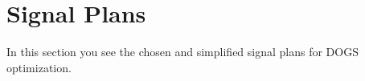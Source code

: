 \section{Signal Plans}
\label{app:signalplans}
In this section you see the chosen and simplified signal plans for DOGS optimization.

